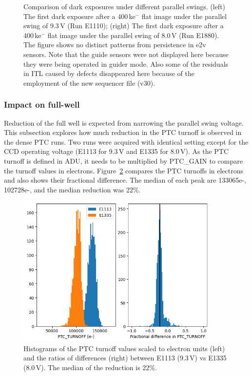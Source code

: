 \begin{figure}[ht]
\begin{minipage}[b]{0.45\textwidth}
\end{minipage}
\caption{Comparison of dark exposures under different parallel swings. (left) The first dark exposure after a 400\,ke$^-$ flat image under the parallel swing of 9.3\,V (Run E1110); (right) The first dark exposure after a 400\,ke$^-$ flat image under the parallel swing of 8.0\,V (Run E1880). The figure shows no distinct patterns from persistence in e2v sensors. Note that the guide sensors were not displayed here because they were being operated in guider mode. Also some of the residuals in ITL caused by defects disappeared here because of the employment of the new sequencer file (v30).}
\label{fig:persistence-reduction}
\end{figure}



\subsubsection{Impact on full-well}\label{impact-on-full-well}

Reduction of the full well is expected from narrowing the parallel swing
voltage. This subsection explores how much reduction in the PTC turnoff
is observed in the dense PTC runs. Two runs were acquired with identical
setting except for the CCD operating voltage (E1113 for 9.3\,V and E1335
for 8.0\,V). As the PTC turnoff is defined in ADU, it needs to be
multiplied by PTC\_GAIN to compare the turnoff values in electrons.
Figure~\ref{fig:ptc-turnoff} compares the PTC turnoffs in electrons and also shows their
fractional difference. The median of each peak are 133065e-, 102728e-, and the median reduction was 22\%.

\begin{figure}[ht]
\begin{centering}
\includegraphics[width=0.9\textwidth]{figures/PtcTurnoffRatio.png}
\end{centering}
\caption{Histograms of the PTC turnoff values scaled to electron units (left) and the ratios of
differences (right) between E1113 (9.3\,V) vs E1335 (8.0\,V). The median of
the reduction is 22\%.}
\label{fig:ptc-turnoff}
\end{figure}



